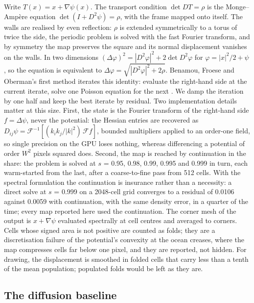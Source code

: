 Write \(T(x) = x + \nabla\psi(x)\). The transport condition
\(\det DT = \rho\) is the Monge--Ampère equation
\(\det(I + D^2\psi) = \rho\), with the frame mapped onto itself. The
walls are realised by even reflection: \(\rho\) is extended
symmetrically to a torus of twice the side, the periodic problem is
solved with the fast Fourier transform, and by symmetry the map
preserves the square and its normal displacement vanishes on the walls.
In two dimensions
\((\Delta\varphi)^2 = |D^2\varphi|^2 + 2\det D^2\varphi\) for
\(\varphi = |x|^2/2 + \psi\), so the equation is equivalent to
\(\Delta\varphi = \sqrt{|D^2\varphi|^2 + 2\rho}\). Benamou, Froese and
Oberman's first method iterates this identity: evaluate the right-hand
side at the current iterate, solve one Poisson equation for the next
\citep{benamou2010}. We damp the iteration by one half and keep the best
iterate by residual. Two implementation details matter at this size.
First, the state is the Fourier transform of the right-hand side
\(f = \Delta\psi\), never the potential: the Hessian entries are
recovered as
\(D_{ij}\psi = \mathcal{F}^{-1}[(k_i k_j/|k|^2)\,\mathcal{F}f]\),
bounded multipliers applied to an order-one field, so single precision
on the GPU loses nothing, whereas differencing a potential of order
\(W^2\) pixels squared does. Second, the map is reached by continuation
in the share: the problem is solved at \(s\) = 0.95, 0.98, 0.99, 0.995
and 0.999 in turn, each warm-started from the last, after a
coarse-to-fine pass from 512 cells. With the spectral formulation the
continuation is insurance rather than a necessity: a direct solve at
\(s\) = 0.999 on a 2048-cell grid converges to a residual of 0.0106
against 0.0059 with continuation, with the same density error, in a
quarter of the time; every map reported here used the continuation. The
corner mesh of the output is \(x + \nabla\psi\) evaluated spectrally at
cell centres and averaged to corners. Cells whose signed area is not
positive are counted as folds; they are a discretisation failure of the
potential's convexity at the ocean creases, where the map compresses
cells far below one pixel, and they are reported, not hidden. For
drawing, the displacement is smoothed in folded cells that carry less
than a tenth of the mean population; populated folds would be left as
they are.

\subsection{The diffusion baseline}\label{the-diffusion-baseline}

